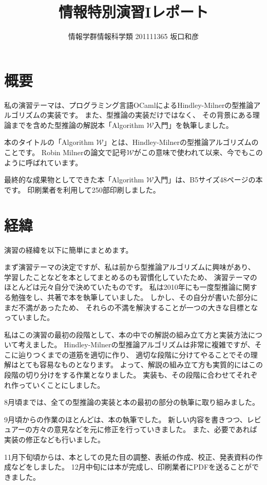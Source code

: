 \documentclass[a4paper]{jsarticle}
\title{情報特別演習Iレポート}
\author{情報学群情報科学類 201111365 坂口和彦}
\begin{document}
\maketitle

\section{概要}

私の演習テーマは、プログラミング言語OCamlによるHindley-Milnerの型推論アルゴリズムの実装です。
また、型推論の実装だけではなく、
その背景にある理論までを含めた型推論の解説本「Algorithm $\mathcal W$入門」を執筆しました。

本のタイトルの「Algorithm $\mathcal W$」とは、Hindley-Milnerの型推論アルゴリズムのことです。
Robin Milnerの論文\cite{milner1978}で記号$\mathcal W$がこの意味で使われて以来、今でもこのように呼ばれています。

最終的な成果物としてできた本「Algorithm $\mathcal W$入門」は、B5サイズ48ページの本です。
印刷業者を利用して250部印刷しました。

\section{経緯}

演習の経緯を以下に簡単にまとめます。

まず演習テーマの決定ですが、私は前から型推論アルゴリズムに興味があり、
学習したことなどを本としてまとめるのも習慣化していたため、
演習テーマのほとんどは元々自分で決めていたものです。
私は2010年にも一度型推論に関する勉強をし、共著で本を執筆していました。
しかし、その自分が書いた部分にまだ不満があったため、
それらの不満を解決することが一つの大きな目標となっていました。

私はこの演習の最初の段階として、本の中での解説の組み立て方と実装方法について考えました。
Hindley-Milnerの型推論アルゴリズムは非常に複雑ですが、そこに辿りつくまでの道筋を適切に作り、
適切な段階に分けてやることでその理解はとても容易なものとなります。
よって、解説の組み立て方も実質的にはこの段階の切り分けをする作業となりました。
実装も、その段階に合わせてそれぞれ作っていくことにしました。

8月頃までは、全ての型推論の実装と本の最初の部分の執筆に取り組みました。

9月頃からの作業のほとんどは、本の執筆でした。
新しい内容を書きつつ、レビュアーの方々の意見などを元に修正を行っていきました。
また、必要であれば実装の修正なども行いました。

11月下旬頃からは、本としての見た目の調整、表紙の作成、校正、発表資料の作成などをしました。
12月中旬には本が完成し、印刷業者にPDFを送ることができました。
\end{document}
